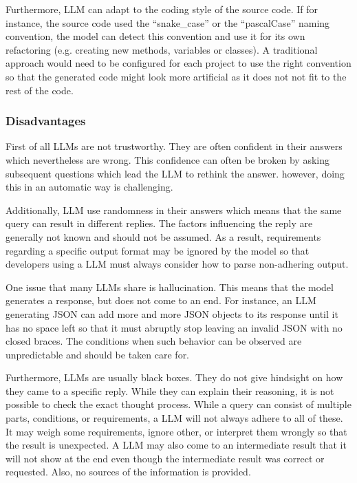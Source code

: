 Furthermore, \ac{LLM} can adapt to the coding style of the source code. If for instance, the source code used the \enquote{snake\_case} or the \enquote{pascalCase} naming convention, the model can detect this convention and use it for its own refactoring (e.g. creating new methods, variables or classes). A traditional approach would need to be configured for each project to use the right convention so that the generated code might look more artificial as it does not not fit to the rest of the code.


\subsubsection{Disadvantages}

First of all \ac{LLM}s are not trustworthy. They are often confident in their answers which nevertheless are wrong. This confidence can often be broken by asking subsequent questions which lead the \ac{LLM} to rethink the answer. however, doing this in an automatic way is challenging. \cite{azaria2023internal}

Additionally, \ac{LLM} use randomness in their answers which means that the same query can result in different replies. The factors influencing the reply are generally not known and should not be assumed. As a result, requirements regarding a specific output format may be ignored by the model so that developers using a \ac{LLM} must always consider how to parse non-adhering output.  \cite{hu2023large}

One issue that many \acp{LLM} share is hallucination. This means that the model generates a response, but does not come to an end. For instance, an \ac{LLM} generating \ac{JSON} can add more and more \ac{JSON} objects to its response until it has no space left so that it must abruptly stop leaving an invalid \ac{JSON} with no closed braces.  The conditions when such behavior can be observed are unpredictable and should be taken care for. 

Furthermore, \ac{LLM}s are usually black boxes. They do not give hindsight on how they came to a specific reply. While they can explain their reasoning, it is not possible to check the exact thought process.
While a query can consist of multiple parts, conditions, or requirements, a \ac{LLM} will not always adhere to all of these. It may weigh some requirements, ignore other, or interpret them wrongly so that the result is unexpected. A \ac{LLM} may also come to an intermediate result that it will not show at the end even though the intermediate result was correct or requested. Also, no sources of the information is provided. \cite{chen2023instructzero}

